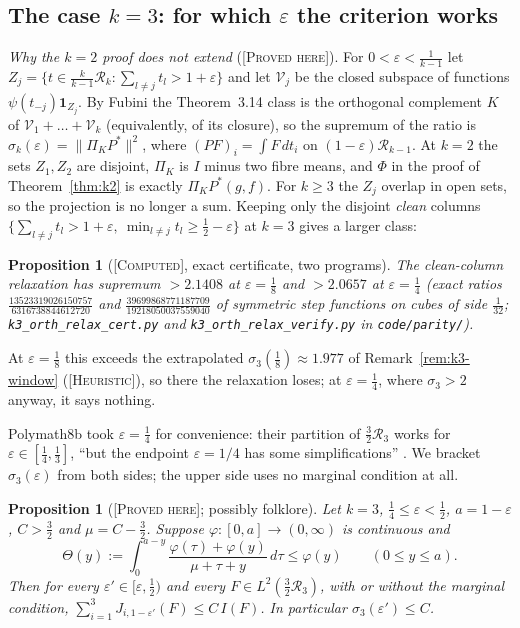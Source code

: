 \documentclass[11pt]{amsart}
\newtheorem{proposition}[theorem]{Proposition}
\theoremstyle{definition}
\theoremstyle{remark}
\newcommand{\lbl}[1]{\textup{\textsc{[#1]}}}
\begin{document}
\subsection{The case \texorpdfstring{$k=3$}{k=3}: for which \texorpdfstring{$\varepsilon$}{eps} the criterion works}\label{subsec:window}

\emph{Why the $k=2$ proof does not extend} (\lbl{Proved here}). For
$0<\varepsilon<\frac1{k-1}$ let $Z_j=\{t\in\frac k{k-1}\mathcal R_k:\sum_{l\ne j}t_l>1+\varepsilon\}$
and let $\mathcal V_j$ be the closed subspace of functions
$\psi(t_{-j})\mathbf 1_{Z_j}$. By Fubini the Theorem~3.14 class is the orthogonal
complement $K$ of $\mathcal V_1+\dots+\mathcal V_k$ (equivalently, of its closure), so the supremum of the ratio is
$\sigma_k(\varepsilon)=\|\Pi_KP^*\|^2$, where $(PF)_i=\int F\,dt_i$ on
$(1-\varepsilon)\mathcal R_{k-1}$. At $k=2$ the sets $Z_1,Z_2$ are disjoint, $\Pi_K$ is
$I$ minus two fibre means, and $\Phi$ in the proof of Theorem~\ref{thm:k2} is
exactly $\Pi_KP^*(g,f)$. For $k\ge3$ the $Z_j$ overlap in open sets, so the
projection is no longer a sum. Keeping only the disjoint \emph{clean} columns
$\{\sum_{l\ne j}t_l>1+\varepsilon,\ \min_{l\ne j}t_l\ge\frac12-\varepsilon\}$ at $k=3$ gives a
larger class:

\begin{proposition}[\lbl{Computed}, exact certificate, two programs]\label{prop:orth-relax}
The clean-column relaxation has supremum $>2.1408$ at $\varepsilon=\frac18$ and
$>2.0657$ at $\varepsilon=\frac14$ (exact ratios
$\frac{13523319026150757}{6316738844612720}$ and
$\frac{39699868771187709}{19218050037559040}$ of symmetric step functions on cubes of
side $\frac1{32}$; \texttt{k3\_orth\_relax\_cert.py} and
\texttt{k3\_orth\_relax\_verify.py} in \texttt{code/}\allowbreak\texttt{parity/}).
\end{proposition}
\noindent At $\varepsilon=\frac18$ this exceeds the extrapolated $\sigma_3(\frac18)\approx1.977$ of
Remark~\ref{rem:k3-window} (\lbl{Heuristic}), so there the relaxation loses; at
$\varepsilon=\frac14$, where $\sigma_3>2$ anyway, it says nothing.

Polymath8b took $\varepsilon=\frac14$ for convenience: their partition of
$\frac32\mathcal R_3$ works for $\varepsilon\in[\frac14,\frac13]$, ``but the endpoint
$\varepsilon=1/4$ has some simplifications'' \cite[p.~63]{PM8b}. We bracket
$\sigma_3(\varepsilon)$ from both sides; the upper side uses no marginal
condition at all.

\begin{proposition}[\lbl{Proved here}; possibly folklore]\label{prop:unc-ceiling}
Let $k=3$, $\frac14\le\varepsilon<\frac12$, $a=1-\varepsilon$, $C>\frac32$ and
$\mu=C-\frac32$. Suppose $\varphi:[0,a]\to(0,\infty)$ is continuous and
\[
\Theta(y):=\int_0^{a-y}\frac{\varphi(\tau)+\varphi(y)}{\mu+\tau+y}\,d\tau\le\varphi(y)\qquad(0\le y\le a).
\]
Then for every $\varepsilon'\in[\varepsilon,\frac12)$ and every
$F\in L^2(\frac32\mathcal R_3)$, with or without the marginal condition,
$\sum_{i=1}^3J_{i,1-\varepsilon'}(F)\le C\,I(F)$. In particular
$\sigma_3(\varepsilon')\le C$.
\end{proposition}
\end{document}
